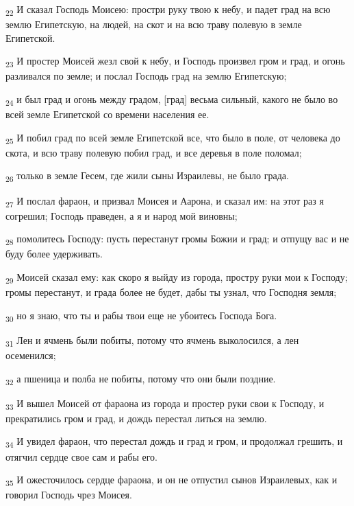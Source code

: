 \begin{tcolorbox}
\textsubscript{22} И сказал Господь Моисею: простри руку твою к небу, и падет град на всю землю Египетскую, на людей, на скот и на всю траву полевую в земле Египетской.
\end{tcolorbox}
\begin{tcolorbox}
\textsubscript{23} И простер Моисей жезл свой к небу, и Господь произвел гром и град, и огонь разливался по земле; и послал Господь град на землю Египетскую;
\end{tcolorbox}
\begin{tcolorbox}
\textsubscript{24} и был град и огонь между градом, [град] весьма сильный, какого не было во всей земле Египетской со времени населения ее.
\end{tcolorbox}
\begin{tcolorbox}
\textsubscript{25} И побил град по всей земле Египетской все, что было в поле, от человека до скота, и всю траву полевую побил град, и все деревья в поле поломал;
\end{tcolorbox}
\begin{tcolorbox}
\textsubscript{26} только в земле Гесем, где жили сыны Израилевы, не было града.
\end{tcolorbox}
\begin{tcolorbox}
\textsubscript{27} И послал фараон, и призвал Моисея и Аарона, и сказал им: на этот раз я согрешил; Господь праведен, а я и народ мой виновны;
\end{tcolorbox}
\begin{tcolorbox}
\textsubscript{28} помолитесь Господу: пусть перестанут громы Божии и град; и отпущу вас и не буду более удерживать.
\end{tcolorbox}
\begin{tcolorbox}
\textsubscript{29} Моисей сказал ему: как скоро я выйду из города, простру руки мои к Господу; громы перестанут, и града более не будет, дабы ты узнал, что Господня земля;
\end{tcolorbox}
\begin{tcolorbox}
\textsubscript{30} но я знаю, что ты и рабы твои еще не убоитесь Господа Бога.
\end{tcolorbox}
\begin{tcolorbox}
\textsubscript{31} Лен и ячмень были побиты, потому что ячмень выколосился, а лен осеменился;
\end{tcolorbox}
\begin{tcolorbox}
\textsubscript{32} а пшеница и полба не побиты, потому что они были поздние.
\end{tcolorbox}
\begin{tcolorbox}
\textsubscript{33} И вышел Моисей от фараона из города и простер руки свои к Господу, и прекратились гром и град, и дождь перестал литься на землю.
\end{tcolorbox}
\begin{tcolorbox}
\textsubscript{34} И увидел фараон, что перестал дождь и град и гром, и продолжал грешить, и отягчил сердце свое сам и рабы его.
\end{tcolorbox}
\begin{tcolorbox}
\textsubscript{35} И ожесточилось сердце фараона, и он не отпустил сынов Израилевых, как и говорил Господь чрез Моисея.
\end{tcolorbox}
